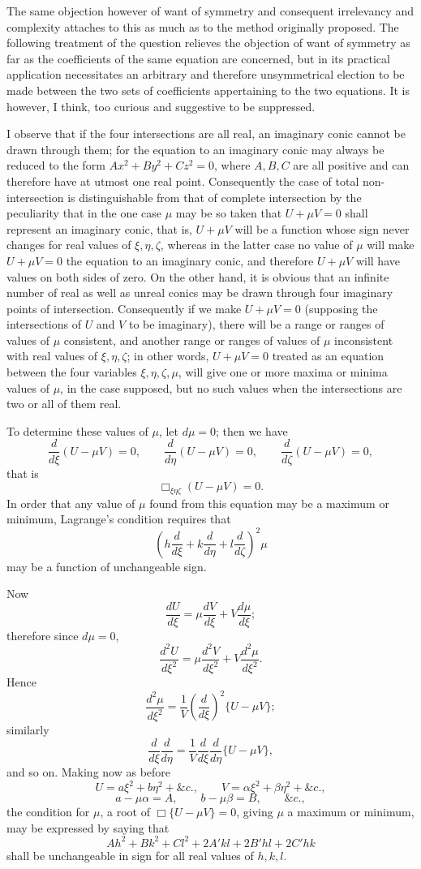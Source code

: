 \documentclass[11pt]{article}
\newcommand{\sourcepage}[1]{\marginpar{\scriptsize p.~#1}}
\begin{document}
\sourcepage{122}
The same objection however of want of symmetry and consequent irrelevancy and complexity attaches to this as much as to the method originally proposed. The following treatment of the question relieves the objection of want of symmetry as far as the coefficients of the same equation are concerned, but in its practical application necessitates an arbitrary and therefore unsymmetrical election to be made between the two sets of coefficients appertaining to the two equations. It is however, I think, too curious and suggestive to be suppressed.

I observe that if the four intersections are all real, an imaginary conic cannot be drawn through them; for the equation to an imaginary conic may always be reduced to the form $Ax^2+By^2+Cz^2=0$, where $A,B,C$ are all positive and can therefore have at utmost one real point. Consequently the case of total non-intersection is distinguishable from that of complete intersection by the peculiarity that in the one case $\mu$ may be so taken that $U+\mu V=0$ shall represent an imaginary conic, that is, $U+\mu V$ will be a function whose sign never changes for real values of $\xi,\eta,\zeta$, whereas in the latter case no value of $\mu$ will make $U+\mu V=0$ the equation to an imaginary conic, and therefore $U+\mu V$ will have values on both sides of zero. On the other hand, it is obvious that an infinite number of real as well as unreal conics may be drawn through four imaginary points of intersection. Consequently if we make $U+\mu V=0$ (supposing the intersections of $U$ and $V$ to be imaginary), there will be a range or ranges of values of $\mu$ consistent, and another range or ranges of values of $\mu$ inconsistent with real values of $\xi,\eta,\zeta$; in other words, $U+\mu V=0$ treated as an equation between the four variables $\xi,\eta,\zeta,\mu$, will give one or more maxima or minima values of $\mu$, in the case supposed, but no such values when the intersections are two or all of them real.

To determine these values of $\mu$, let $d\mu=0$; then we have
\[
\frac{d}{d\xi}(U-\mu V)=0,\qquad
\frac{d}{d\eta}(U-\mu V)=0,\qquad
\frac{d}{d\zeta}(U-\mu V)=0,
\]
that is
\[
\Box_{\xi\eta\zeta}(U-\mu V)=0.
\]
In order that any value of $\mu$ found from this equation may be a maximum or minimum, Lagrange's condition requires that
\[
\left(h\frac{d}{d\xi}+k\frac{d}{d\eta}+l\frac{d}{d\zeta}\right)^2\mu
\]
may be a function of unchangeable sign.

\sourcepage{123}
Now
\[
\frac{dU}{d\xi}=\mu\frac{dV}{d\xi}+V\frac{d\mu}{d\xi};
\]
therefore since $d\mu=0$,
\[
\frac{d^2U}{d\xi^2}=\mu\frac{d^2V}{d\xi^2}+V\frac{d^2\mu}{d\xi^2}.
\]
Hence
\[
\frac{d^2\mu}{d\xi^2}=\frac{1}{V}\left(\frac{d}{d\xi}\right)^2\{U-\mu V\};
\]
similarly
\[
\frac{d}{d\xi}\frac{d}{d\eta}
=\frac{1}{V}\frac{d}{d\xi}\frac{d}{d\eta}\{U-\mu V\},
\]
and so on. Making now as before
\[
U=a\xi^2+b\eta^2+\&c.,\qquad
V=\alpha\xi^2+\beta\eta^2+\&c.,
\]
\[
a-\mu\alpha=A,\qquad b-\mu\beta=B,\qquad \&c.,
\]
the condition for $\mu$, a root of $\Box\{U-\mu V\}=0$, giving $\mu$ a maximum or minimum, may be expressed by saying that
\[
Ah^2+Bk^2+Cl^2+2A'kl+2B'hl+2C'hk
\]
shall be unchangeable in sign for all real values of $h,k,l$.
\end{document}
